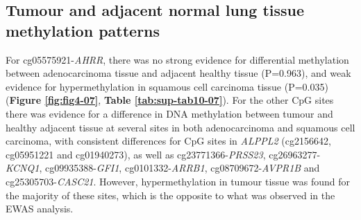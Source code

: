 \documentclass[11pt,twoside]{bristolthesis}
\begin{document}
\hypertarget{lc-heathly-v-normal}{%
\subsection{Tumour and adjacent normal lung tissue methylation patterns}\label{lc-heathly-v-normal}}

For cg05575921-\emph{AHRR}, there was no strong evidence for differential methylation between adenocarcinoma tissue and adjacent healthy tissue (P=0.963), and weak evidence for hypermethylation in squamous cell carcinoma tissue (P=0.035) (\textbf{Figure \ref{fig:fig4-07}}, \textbf{Table \ref{tab:sup-tab10-07}}). For the other CpG sites there was evidence for a difference in DNA methylation between tumour and healthy adjacent tissue at several sites in both adenocarcinoma and squamous cell carcinoma, with consistent differences for CpG sites in \emph{ALPPL2} (cg2156642, cg05951221 and cg01940273), as well as cg23771366-\emph{PRSS23}, cg26963277-\emph{KCNQ1}, cg09935388-\emph{GFI1}, cg0101332-\emph{ARRB1}, cg08709672-\emph{AVPR1B} and cg25305703-\emph{CASC21}. However, hypermethylation in tumour tissue was found for the majority of these sites, which is the opposite to what was observed in the EWAS analysis.

\pagebreak
\end{document}
